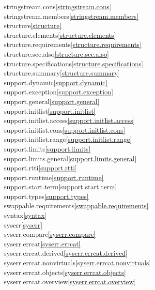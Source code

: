 \begin{multicols}{2}
stringstream.cons\quad\ref{stringstream.cons}\\
stringstream.members\quad\ref{stringstream.members}\\
structure\quad\ref{structure}\\
structure.elements\quad\ref{structure.elements}\\
structure.requirements\quad\ref{structure.requirements}\\
structure.see.also\quad\ref{structure.see.also}\\
structure.specifications\quad\ref{structure.specifications}\\
structure.summary\quad\ref{structure.summary}\\
support.dynamic\quad\ref{support.dynamic}\\
support.exception\quad\ref{support.exception}\\
support.general\quad\ref{support.general}\\
support.initlist\quad\ref{support.initlist}\\
support.initlist.access\quad\ref{support.initlist.access}\\
support.initlist.cons\quad\ref{support.initlist.cons}\\
support.initlist.range\quad\ref{support.initlist.range}\\
support.limits\quad\ref{support.limits}\\
support.limits.general\quad\ref{support.limits.general}\\
support.rtti\quad\ref{support.rtti}\\
support.runtime\quad\ref{support.runtime}\\
support.start.term\quad\ref{support.start.term}\\
support.types\quad\ref{support.types}\\
swappable.requirements\quad\ref{swappable.requirements}\\
syntax\quad\ref{syntax}\\
syserr\quad\ref{syserr}\\
syserr.compare\quad\ref{syserr.compare}\\
syserr.errcat\quad\ref{syserr.errcat}\\
syserr.errcat.derived\quad\ref{syserr.errcat.derived}\\
syserr.errcat.nonvirtuals\quad\ref{syserr.errcat.nonvirtuals}\\
syserr.errcat.objects\quad\ref{syserr.errcat.objects}\\
syserr.errcat.overview\quad\ref{syserr.errcat.overview}\\

\end{multicols}
